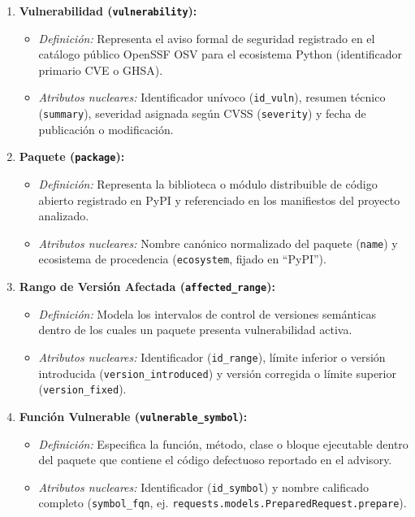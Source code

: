 \begin{enumerate}
    \item \textbf{Vulnerabilidad (\texttt{vulnerability}):}
    \begin{itemize}
        \item \textit{Definición:} Representa el aviso formal de seguridad registrado en el catálogo público OpenSSF OSV para el ecosistema Python (identificador primario CVE o GHSA).
        \item \textit{Atributos nucleares:} Identificador unívoco (\texttt{id\_\allowbreak vuln}), resumen técnico (\texttt{summary}), severidad asignada según CVSS (\texttt{severity}) y fecha de publicación o modificación.
    \end{itemize}

    \item \textbf{Paquete (\texttt{package}):}
    \begin{itemize}
        \item \textit{Definición:} Representa la biblioteca o módulo distribuible de código abierto registrado en PyPI y referenciado en los manifiestos del proyecto analizado.
        \item \textit{Atributos nucleares:} Nombre canónico normalizado del paquete (\texttt{name}) y ecosistema de procedencia (\texttt{ecosystem}, fijado en ``PyPI'').
    \end{itemize}

    \item \textbf{Rango de Versión Afectada (\texttt{affected\_\allowbreak range}):}
    \begin{itemize}
        \item \textit{Definición:} Modela los intervalos de control de versiones semánticas dentro de los cuales un paquete presenta vulnerabilidad activa.
        \item \textit{Atributos nucleares:} Identificador (\texttt{id\_\allowbreak range}), límite inferior o versión introducida (\texttt{version\_\allowbreak introduced}) y versión corregida o límite superior (\texttt{version\_\allowbreak fixed}).
    \end{itemize}

    \item \textbf{Función Vulnerable (\texttt{vulnerable\_\allowbreak symbol}):}
    \begin{itemize}
        \item \textit{Definición:} Especifica la función, método, clase o bloque ejecutable dentro del paquete que contiene el código defectuoso reportado en el advisory.
        \item \textit{Atributos nucleares:} Identificador (\texttt{id\_\allowbreak symbol}) y nombre calificado completo (\texttt{symbol\_\allowbreak fqn}, ej. \texttt{requests.\allowbreak models.\allowbreak PreparedRequest.\allowbreak prepare}).
    \end{itemize}


\end{enumerate}
